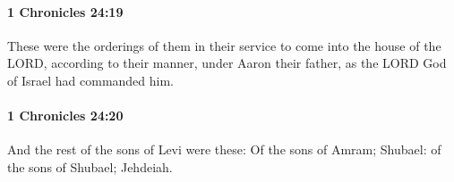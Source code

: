 		\paragraph{1 Chronicles 24:19} %
			\label{1CHRONICLES-24-19}

			These were the orderings of them in their service to come into the house of the LORD, according to their manner, under Aaron their father, as the LORD God of Israel had commanded him.


		\paragraph{1 Chronicles 24:20} %
			\label{1CHRONICLES-24-20}

			And the rest of the sons of Levi were these: Of the sons of Amram; Shubael: of the sons of Shubael; Jehdeiah.


